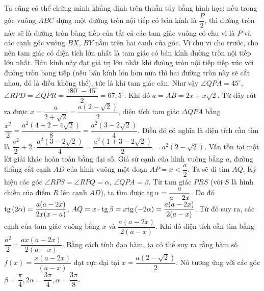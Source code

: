 \begin{multicols}{2}
	\vskip 0.1cm 
	Ta cũng có thể chứng minh khẳng định trên thuần túy bằng hình học: nếu trong góc vuông $ABC$ dựng một đường tròn nội tiếp có bán kính là $\dfrac{P}{2}$, thì đường tròn này sẽ là đường tròn bàng tiếp của tất cả các tam giác vuông có chu vi là $P$ và các cạnh góc vuông $BX$, $BY$ nằm trên hai cạnh của góc. Vì chu vi cho trước, cho nên tam giác có diện tích lớn nhất là tam giác có bán kính đường tròn nội tiếp lớn nhất. Bán kính này đạt giá trị lớn nhất khi đường tròn nội tiếp tiếp xúc với đường tròn bang tiếp (nếu bán kính lớn hơn nữa thì hai đường tròn này sẽ cắt nhau, đó là điều không thể), tức là khi tam giác cân. 
	Như vậy  $\angle QPA = 45^\circ$, $\angle RPD = \angle QPR = \dfrac{180^\circ - 45^\circ}{2} = 67,5^\circ$. Khi đó $a = AB = 2x + x\sqrt 2 $. Từ đây rút ra được $x = \dfrac{a}{{2 + \sqrt 2 }} = \dfrac{{a\left( {2 - \sqrt 2 } \right)}}{2}$, diện tích tam giác $\Delta QPA$  bằng $\dfrac{{{x^2}}}{2} = \dfrac{{{a^2}\left( {4 + 2 - 4\sqrt 2 } \right)}}{8} = \dfrac{{{a^2}\left( {3 - 2\sqrt 2 } \right)}}{4}$. Điều đó có nghĩa là diện tích cần tìm là $\dfrac{{{a^2}}}{2} + 2 \cdot \dfrac{{{a^2}\left( {3 - 2\sqrt 2 } \right)}}{4} = \dfrac{{{a^2}\left( {1 + 3 - 2\sqrt 2 } \right)}}{2} = {a^2}\left( {2 - \sqrt 2 } \right)$.
	\vskip 0.1cm 
	Vẫn tồn tại một lời giải khác hoàn toàn bằng đại số. Giả sử cạnh của hình vuông bằng $a$, đường thẳng cắt cạnh $AD$ của hình vuông một đoạn  $AP = x < \dfrac{a}{2}$. Ta sẽ đi tìm $AQ$. Ký hiệu các góc $\angle RPS = \angle RPQ = \alpha $, $\angle QPA = \beta$. Từ tam giác $PRS$ (với $S$ là hình chiếu của điểm $R$ lên cạnh $AD$), ta tìm được ${\rm{tg}}\,\alpha  = \dfrac{a}{{a - 2x}}$. Do đó  ${\rm{tg}}\,(2\alpha ) = \dfrac{{a(a - 2x)}}{{2x(x - a)}}$,  $AQ = x \cdot {\rm{tg}}\,\beta  = x{\rm{tg}}\,( - 2\alpha ) = \dfrac{{a(a - 2x)}}{{2(a - x)}}$.
	\vskip 0.1cm
	Từ đó suy ra, các cạnh của tam giác vuông bằng $x$ và  $\dfrac{{a(a - 2x)}}{{2(a - x)}}$. Khi đó diện tích cần tìm bằng $\dfrac{{{a^2}}}{2} + \dfrac{{ax(a - 2x)}}{{2(a - x)}}$. Bằng cách tính đạo hàm, ta có thể suy ra rằng hàm số $f(x) = \dfrac{{x(a - 2x)}}{{(a - x)}}$  đạt cực đại tại  $x = \dfrac{{a(2 - \sqrt 2 )}}{2}$. Nó tương ứng với các góc  $\beta = \dfrac{\pi}{4}, 2\alpha = \dfrac{3\pi}{4}, \alpha = \dfrac{3\pi}{8}$.

\end{multicols}
